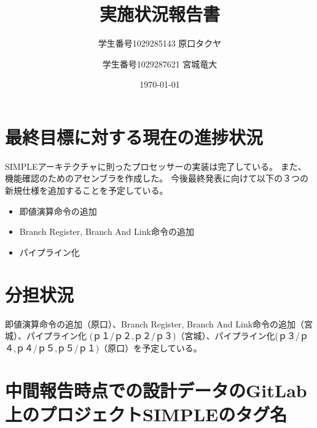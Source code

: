 \documentclass{jsreport}
\title{実施状況報告書}
\author{学生番号1029285143 原口タクヤ \and 学生番号1029287621 宮城竜大}
\date{\today}
\begin{document}
\maketitle
\clearpage

\section{最終目標に対する現在の進捗状況}
    SIMPLEアーキテクチャに則ったプロセッサーの実装は完了している。
    また、機能確認のためのアセンブラを作成した。
    今後最終発表に向けて以下の３つの新規仕様を追加することを予定している。
    
    \begin{itemize}
    \item 即値演算命令の追加
    \item Branch Register, Branch And Link命令の追加
    \item パイプライン化
    \end{itemize}

\section{分担状況}
	即値演算命令の追加（原口）、Branch Register, Branch And Link命令の追加（宮城）、パイプライン化 (ｐ１/ｐ２,ｐ２/ｐ３)（宮城）、パイプライン化(ｐ３/ｐ４,ｐ４/ｐ５,ｐ５/ｐ１)（原口）を予定している。
    	

\section{中間報告時点での設計データのGitLab上のプロジェクトSIMPLEのタグ名}
\end{document}
